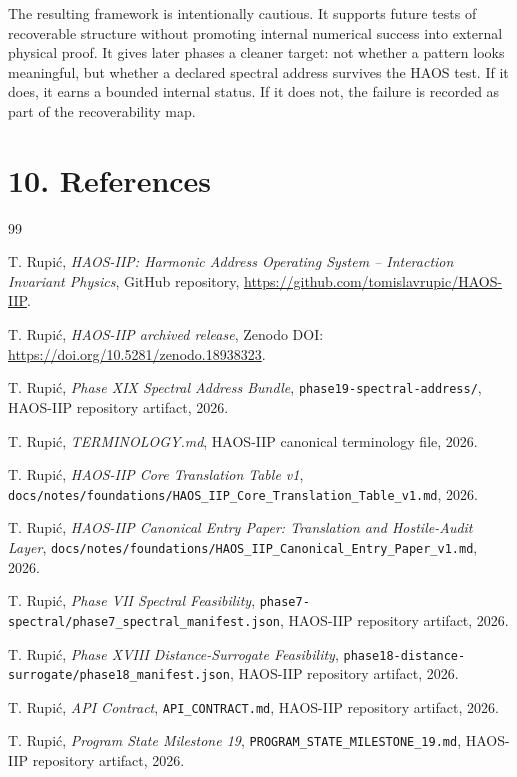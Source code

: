 \documentclass[11pt]{article}
\begin{document}
The resulting framework is intentionally cautious. It supports future tests of recoverable structure without promoting internal numerical success into external physical proof. It gives later phases a cleaner target: not whether a pattern looks meaningful, but whether a declared spectral address survives the HAOS test. If it does, it earns a bounded internal status. If it does not, the failure is recorded as part of the recoverability map.

\section*{10. References}

\begin{thebibliography}{99}

T. Rupi\'c,
\emph{HAOS-IIP: Harmonic Address Operating System -- Interaction Invariant Physics},
GitHub repository,
\url{https://github.com/tomislavrupic/HAOS-IIP}.

T. Rupi\'c,
\emph{HAOS-IIP archived release},
Zenodo DOI:
\url{https://doi.org/10.5281/zenodo.18938323}.

T. Rupi\'c,
\emph{Phase XIX Spectral Address Bundle},
\texttt{phase19-spectral-address/},
HAOS-IIP repository artifact, 2026.

T. Rupi\'c,
\emph{TERMINOLOGY.md},
HAOS-IIP canonical terminology file, 2026.

T. Rupi\'c,
\emph{HAOS-IIP Core Translation Table v1},
\texttt{docs/notes/foundations/HAOS\_IIP\_Core\_Translation\_Table\_v1.md},
2026.

T. Rupi\'c,
\emph{HAOS-IIP Canonical Entry Paper: Translation and Hostile-Audit Layer},
\texttt{docs/notes/foundations/HAOS\_IIP\_Canonical\_Entry\_Paper\_v1.md},
2026.

T. Rupi\'c,
\emph{Phase VII Spectral Feasibility},
\texttt{phase7-spectral/phase7\_spectral\_manifest.json},
HAOS-IIP repository artifact, 2026.

T. Rupi\'c,
\emph{Phase XVIII Distance-Surrogate Feasibility},
\texttt{phase18-distance-surrogate/phase18\_manifest.json},
HAOS-IIP repository artifact, 2026.

T. Rupi\'c,
\emph{API Contract},
\texttt{API\_CONTRACT.md},
HAOS-IIP repository artifact, 2026.

T. Rupi\'c,
\emph{Program State Milestone 19},
\texttt{PROGRAM\_STATE\_MILESTONE\_19.md},
HAOS-IIP repository artifact, 2026.

\end{thebibliography}
\end{document}
